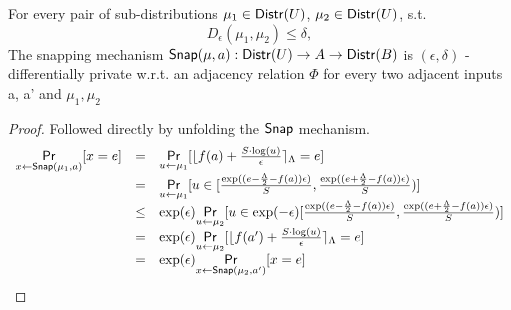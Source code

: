 \documentclass[a4paper,11pt]{article}
\begin{document}
\begin{prop}
For every pair of sub-distributions $\mu_1 \in \mathsf{Distr}(U)$, $\mu_2 \in \mathsf{Distr}(U)$, s.t. 
\[
D_{\epsilon}(\mu_1, \mu_2) \leq \delta,
\]
The snapping mechanism $\mathsf{Snap}(\mu, a) : \mathsf{Distr}(U) \to A \to \mathsf{Distr}(B)$ is $(\epsilon, \delta)$ - differentially private w.r.t. an adjacency relation $\Phi$ for every two adjacent inputs a, a’ and $\mu_1, \mu_2$
\end{prop}

\begin{proof}
Followed directly by unfolding the $\mathsf{Snap}$ mechanism.
\[
	\begin{array}{lll}
	\underset{x \leftarrow \mathsf{Snap}(\mu_1, a)}{\mathsf{Pr}}[x = e] 
	& = & \underset{u \leftarrow \mu_1}{\mathsf{Pr}}[	\lfloor 
				f(a) + \frac{ S \cdot \log(u)}{\epsilon} 
				 \rceil_{\Lambda} = e
			]\\
	& = & \underset{ u \leftarrow \mu_1}{\mathsf{Pr}}[ u \in [
		   		\frac{\exp((e - \frac{\Lambda}{2} - f(a)) \epsilon )}{S},
		   		\frac{\exp((e + \frac{\Lambda}{2} - f(a)) \epsilon )}{S})
		   	]\\
	& \leq & \exp(\epsilon)
			\underset{ u \leftarrow \mu_2}{\mathsf{Pr}}[ u \in \exp(-\epsilon)[
		   		\frac{\exp((e - \frac{\Lambda}{2} - f(a)) \epsilon )}{S},
		   		\frac{\exp((e + \frac{\Lambda}{2} - f(a)) \epsilon )}{S})
		   	]\\
	& = & \exp(\epsilon)
			\underset{u \leftarrow \mu_2}{\mathsf{Pr}}[	\lfloor f(a') + \frac{ S \cdot \log(u)}{\epsilon} \rceil_{\Lambda} = e
			]\\
	& = & \exp(\epsilon)
			\underset{x \leftarrow \mathsf{Snap}(\mu_2, a')}{\mathsf{Pr}}[x = e] 
	\end{array}
\]
\end{proof}
\end{document}
